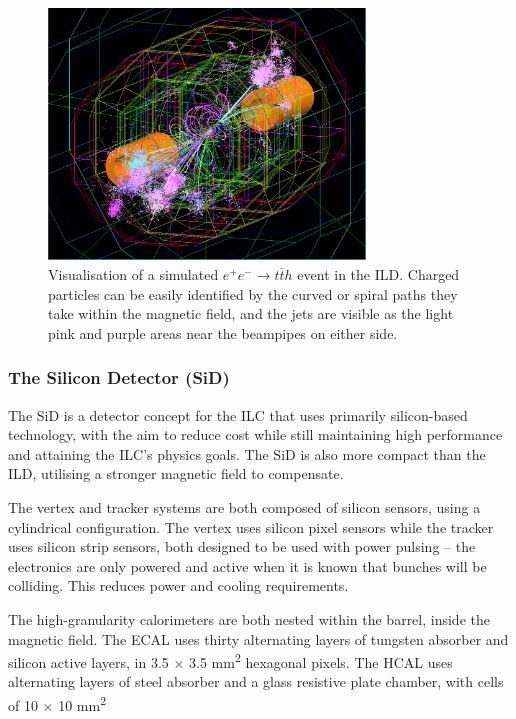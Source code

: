 \begin{figure}[p]
	\centering
	\includegraphics[width=0.75\textwidth]{../Pictures/SimulatedEvent1.png}
	\caption{Visualisation of a simulated $e^+ e^- \rightarrow t \overline{t} h$ event in the \acrshort{ILD}. Charged particles can be easily identified by the curved or spiral paths they take within the magnetic field, and the jets are visible as the light pink and purple areas near the beampipes on either side.}
	\label{figure:colliders/ILD/tth-simulation}
\end{figure}

\subsubsection{The Silicon Detector (SiD)}
The \acrfull{SiD} is a detector concept for the \acrshort{ILC} that uses primarily silicon-based technology, with the aim to reduce cost while still maintaining high performance and attaining the \acrshort{ILC}'s physics goals. The \acrshort{SiD} is also more compact than the \acrshort{ILD}, utilising a stronger magnetic field to compensate.

The vertex and tracker systems are both composed of silicon sensors, using a cylindrical configuration. The vertex uses silicon pixel sensors while the tracker uses silicon strip sensors, both designed to be used with power pulsing -- the electronics are only powered and active when it is known that bunches will be colliding. This reduces power and cooling requirements. 

The high-granularity calorimeters are both nested within the barrel, inside the magnetic field. The \acrshort{ECAL} uses thirty alternating layers of tungsten absorber and silicon active layers, in 3.5 $\times$ 3.5 mm\textsuperscript{2} hexagonal pixels. The \acrshort{HCAL} uses alternating layers of steel absorber and a glass resistive plate chamber, with cells of 10 $\times$ 10 mm\textsuperscript{2}

